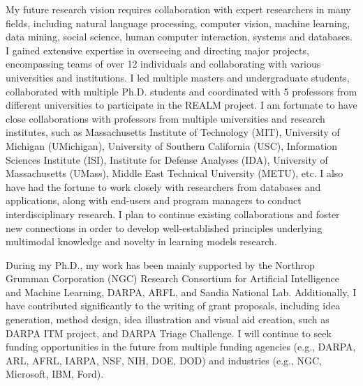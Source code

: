 My future research vision requires collaboration with expert researchers in many
fields, including natural language processing, computer vision, machine learning, data mining, social science, human computer interaction, systems and databases. 
I gained extensive expertise in overseeing and directing major projects, encompassing teams of over 12 individuals and collaborating with various universities and institutions.
I led multiple masters and undergraduate students, collaborated with multiple Ph.D. students and coordinated with 5 professors from different universities to participate in the REALM project. I am fortunate to have close collaborations with professors from multiple universities and research institutes, such as Massachusetts Institute of Technology (MIT), University of Michigan (UMichigan), University of Southern California (USC), Information Sciences Institute (ISI), Institute for Defense Analyses (IDA), University of Massachusetts (UMass), Middle East Technical University (METU), etc. I also have had the fortune to work closely with researchers from databases and applications, along with end-users and program managers to conduct interdisciplinary research. I plan to continue existing collaborations and foster new connections in order to develop
well-established principles underlying multimodal knowledge and novelty in learning models research.

During my Ph.D., my work has been mainly supported by the Northrop Grumman Corporation (NGC) Research Consortium for Artificial Intelligence and Machine Learning, DARPA, ARFL, and Sandia National Lab. 
Additionally, I have contributed significantly to the writing of grant proposals, including idea
generation, method design, idea illustration and visual aid creation, such as 
DARPA ITM project, and DARPA Triage Challenge.
I will continue to seek funding opportunities in the future from multiple funding agencies (e.g., DARPA, ARL, AFRL, IARPA, NSF, NIH, DOE, DOD) and industries (e.g., NGC, Microsoft, IBM, Ford).








